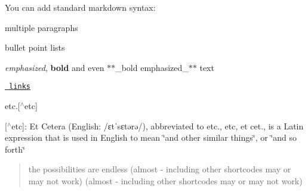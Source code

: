 You can add standard markdown syntax\+:


\begin{DoxyItemize}
\item multiple paragraphs
\item bullet point lists
\item {\itshape emphasized}, {\bfseries{bold}} and even $\ast$$\ast$\+\_\+bold emphasized\+\_\+$\ast$$\ast$ text
\item \href{https://example.com}{\texttt{ links}}
\item etc.\mbox{[}$^\wedge$etc\mbox{]}
\end{DoxyItemize}

\mbox{[}$^\wedge$etc\mbox{]}\+: Et Cetera (English\+: /ɛtˈsɛtərə/), abbreviated to etc., etc, et cet., is a Latin expression that is used in English to mean \char`\"{}and other similar things\char`\"{}, or \char`\"{}and so forth\char`\"{}


\begin{DoxyCode}{0}

\end{DoxyCode}


\begin{quote}
the possibilities are endless (almost -\/ including other shortcodes may or may not work) (almost -\/ including other shortcodes may or may not work) \end{quote}
